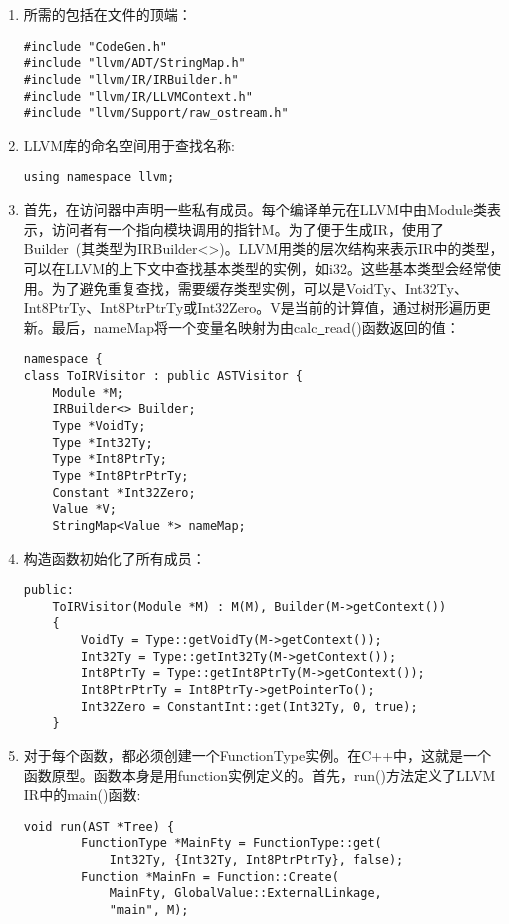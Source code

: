 \begin{enumerate}
\item 所需的包括在文件的顶端：
\begin{lstlisting}[caption={}]
#include "CodeGen.h"
#include "llvm/ADT/StringMap.h"
#include "llvm/IR/IRBuilder.h"
#include "llvm/IR/LLVMContext.h"
#include "llvm/Support/raw_ostream.h"
\end{lstlisting}

\item LLVM库的命名空间用于查找名称:
\begin{lstlisting}[caption={}]
using namespace llvm;
\end{lstlisting}

\item 首先，在访问器中声明一些私有成员。每个编译单元在LLVM中由Module类表示，访问者有一个指向模块调用的指针M。为了便于生成IR，使用了Builder\ (其类型为IRBuilder<>)。LLVM用类的层次结构来表示IR中的类型，可以在LLVM的上下文中查找基本类型的实例，如i32。这些基本类型会经常使用。为了避免重复查找，需要缓存类型实例，可以是VoidTy、Int32Ty、Int8PtrTy、Int8PtrPtrTy或Int32Zero。V是当前的计算值，通过树形遍历更新。最后，nameMap将一个变量名映射为由calc\underline{~}read()函数返回的值：
\begin{lstlisting}[caption={}]
namespace {
class ToIRVisitor : public ASTVisitor {
	Module *M;
	IRBuilder<> Builder;
	Type *VoidTy;
	Type *Int32Ty;
	Type *Int8PtrTy;
	Type *Int8PtrPtrTy;
	Constant *Int32Zero;
	Value *V;
	StringMap<Value *> nameMap;
\end{lstlisting}

\item 构造函数初始化了所有成员：
\begin{lstlisting}[caption={}]
public:
	ToIRVisitor(Module *M) : M(M), Builder(M->getContext())
	{
		VoidTy = Type::getVoidTy(M->getContext());
		Int32Ty = Type::getInt32Ty(M->getContext());
		Int8PtrTy = Type::getInt8PtrTy(M->getContext());
		Int8PtrPtrTy = Int8PtrTy->getPointerTo();
		Int32Zero = ConstantInt::get(Int32Ty, 0, true);
	}
\end{lstlisting}

\item 对于每个函数，都必须创建一个FunctionType实例。在C++中，这就是一个函数原型。函数本身是用function实例定义的。首先，run()方法定义了LLVM IR中的main()函数:
\begin{lstlisting}[caption={}]
	void run(AST *Tree) {
		FunctionType *MainFty = FunctionType::get(
			Int32Ty, {Int32Ty, Int8PtrPtrTy}, false);
		Function *MainFn = Function::Create(
			MainFty, GlobalValue::ExternalLinkage,
			"main", M);
\end{lstlisting}


\end{enumerate}
